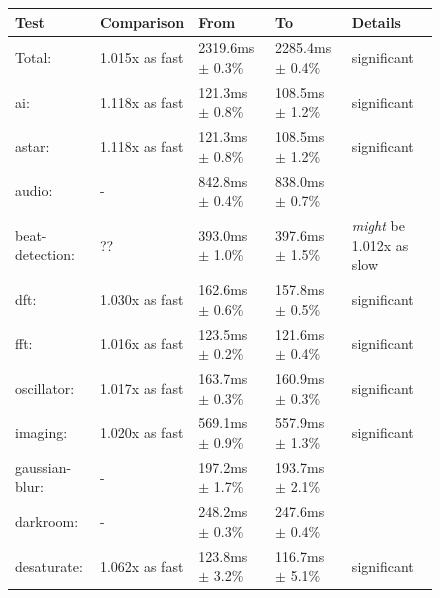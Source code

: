 \documentclass{article}
\begin{document}
\begin{figure}[H]
\begin{tabular}{|l|l|l|l|l|}
\hline
    \textbf{Test}     &\textbf{Comparison} & \textbf{From}        & \textbf{To}           &  \textbf{Details} \\
\hline\hline
    Total:                      & 1.015x as fast   & 2319.6ms $\pm$ 0.3\% &  2285.4ms $\pm$ 0.4\%  &   significant\\
\hline\hline
      ai:                       & 1.118x as fast   &  121.3ms $\pm$ 0.8\% &   108.5ms $\pm$ 1.2\%  &   significant\\
\hline\hspace{0.5em} astar:                  & 1.118x as fast   &  121.3ms $\pm$ 0.8\% &   108.5ms $\pm$ 1.2\%  &   significant\\
\hline\hline
      audio:                    & -                &  842.8ms $\pm$ 0.4\% &   838.0ms $\pm$ 0.7\%  &\\
\hline\hspace{0.5em} beat-detection:         & ??               &  393.0ms $\pm$ 1.0\% &   397.6ms $\pm$ 1.5\%  &   \textit{might} be 1.012x as slow\\
\hline\hspace{0.5em} dft:                    & 1.030x as fast   &  162.6ms $\pm$ 0.6\% &   157.8ms $\pm$ 0.5\%  &   significant\\
\hline\hspace{0.5em} fft:                    & 1.016x as fast   &  123.5ms $\pm$ 0.2\% &   121.6ms $\pm$ 0.4\%  &   significant\\
\hline\hspace{0.5em} oscillator:             & 1.017x as fast   &  163.7ms $\pm$ 0.3\% &   160.9ms $\pm$ 0.3\%  &   significant\\
\hline\hline
      imaging:                  & 1.020x as fast   &  569.1ms $\pm$ 0.9\% &   557.9ms $\pm$ 1.3\%  &   significant\\
\hline\hspace{0.5em} gaussian-blur:          & -                &  197.2ms $\pm$ 1.7\% &   193.7ms $\pm$ 2.1\%  &\\
\hline\hspace{0.5em} darkroom:               & -                &  248.2ms $\pm$ 0.3\% &   247.6ms $\pm$ 0.4\%  &\\
\hline\hspace{0.5em} desaturate:             & 1.062x as fast   &  123.8ms $\pm$ 3.2\% &   116.7ms $\pm$ 5.1\%  &   significant\\

\end{tabular}
\end{figure}
\end{document}

